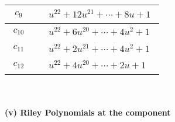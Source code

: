 \documentclass[1p]{elsarticle_modified}
\theoremstyle{definition}
\begin{document}
\begin{tabular}{m{50pt}|m{274pt}}
\hline $$\begin{aligned}c_{9}\end{aligned}$$&$\begin{aligned}
&u^{22}+12 u^{21}+\cdots+8 u+1
\end{aligned}$\\
\hline $$\begin{aligned}c_{10}\end{aligned}$$&$\begin{aligned}
&u^{22}+6 u^{20}+\cdots+4 u^2+1
\end{aligned}$\\
\hline $$\begin{aligned}c_{11}\end{aligned}$$&$\begin{aligned}
&u^{22}+2 u^{21}+\cdots+4 u^2+1
\end{aligned}$\\
\hline $$\begin{aligned}c_{12}\end{aligned}$$&$\begin{aligned}
&u^{22}+4 u^{20}+\cdots+2 u+1
\end{aligned}$\\
\hline
\end{tabular}\\~\\
\newpage\renewcommand{\arraystretch}{1}
\flushleft \textbf{(v) Riley Polynomials at the component}\newline \\
\end{document}
